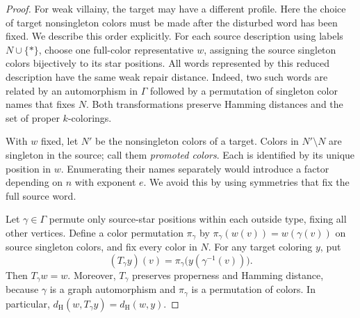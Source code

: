 \documentclass[11pt,reqno]{amsart}
\numberwithin{equation}{section}
\theoremstyle{definition}
\theoremstyle{remark}
\newcommand{\dH}{d_{\mathrm H}}
\begin{document}
\begin{proof}
For weak villainy, the target may have a different profile. Here
the choice of target nonsingleton colors must be made after the
disturbed word has been fixed. We describe this order explicitly.
For each source description using labels $N\cup\{*\}$, choose
one full-color representative $w$, assigning the source singleton
colors bijectively to its star positions. All words represented
by this reduced description have the same weak repair distance.
Indeed, two such words are related by an automorphism in $\Gamma$
followed by a permutation of singleton color names that fixes
$N$. Both transformations preserve Hamming distances and the set
of proper $k$-colorings.

With $w$ fixed, let $N'$ be the nonsingleton colors of a target.
Colors in $N'\setminus N$ are singleton in the source; call them
\emph{promoted colors}. Each is identified by its unique position
in $w$. Enumerating their names separately would introduce a factor
depending on $n$ with exponent $e$. We avoid this by using symmetries
that fix the full source word.

Let $\gamma\in\Gamma$ permute only source-star positions within
each outside type, fixing all other vertices. Define a color
permutation $\pi_\gamma$ by
$\pi_\gamma(w(v))=w(\gamma(v))$ on source singleton colors, and
fix every color in $N$. For any target coloring $y$, put
\[
(T_\gamma y)(v)=\pi_\gamma\bigl(y(\gamma^{-1}(v))\bigr).
\]
Then $T_\gamma w=w$. Moreover, $T_\gamma$ preserves properness
and Hamming distance, because $\gamma$ is a graph automorphism
and $\pi_\gamma$ is a permutation of colors. In particular,
$\dH(w,T_\gamma y)=\dH(w,y)$.


\end{proof}
\end{document}
